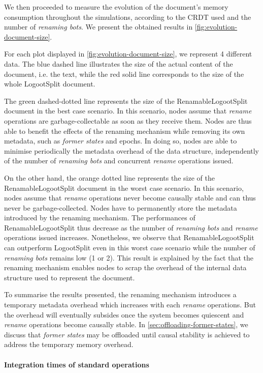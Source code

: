 \documentclass[10pt,journal,compsoc]{IEEEtran}
\newcommand{\ie}{i.e. }
\begin{document}
We then proceeded to measure the evolution of the document's memory consumption throughout the simulations, according to the CRDT used and the number of \emph{renaming bots}.
We present the obtained results in \autoref{fig:evolution-document-size}.

For each plot displayed in \autoref{fig:evolution-document-size}, we represent 4 different data.
The blue dashed line illustrates the size of the actual content of the document, \ie the text, while the red solid line corresponds to the size of the whole LogootSplit document.

The green dashed-dotted line represents the size of the RenamableLogootSplit document in the best case scenario.
In this scenario, nodes assume that \emph{rename} operations are garbage-collectable as soon as they receive them.
Nodes are thus able to benefit the effects of the renaming mechanism while removing its own metadata, such as \emph{former states} and epochs.
In doing so, nodes are able to minimise periodically the metadata overhead of the data structure, independently of the number of \emph{renaming bots} and concurrent \emph{rename} operations issued.

On the other hand, the orange dotted line represents the size of the RenamableLogootSplit document in the worst case scenario.
In this scenario, nodes assume that \emph{rename} operations never become causally stable and can thus never be garbage-collected.
Nodes have to permanently store the metadata introduced by the renaming mechanism.
The performances of RenamableLogootSplit thus decrease as the number of \emph{renaming bots} and \emph{rename} operations issued increases.
Nonetheless, we observe that RenamableLogootSplit can outperform LogootSplit even in this worst case scenario while the number of \emph{renaming bots} remains low (1 or 2).
This result is explained by the fact that the renaming mechanism enables nodes to scrap the overhead of the internal data structure used to represent the document.

To summarise the results presented, the renaming mechanism introduces a temporary metadata overhead which increases with each \emph{rename} operations.
But the overhead will eventually subsides once the system becomes quiescent and \emph{rename} operations become causally stable.
In \autoref{sec:offloading-former-states}, we discuss that \emph{former states} may be offloaded until causal stability is achieved to address the temporary memory overhead.

\paragraph{Integration times of standard operations}
\end{document}
